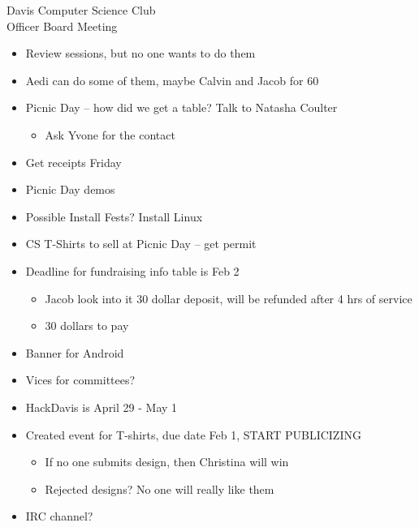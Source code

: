 \documentclass{article}
\begin{document}
\begin{Minutes}{Davis Computer Science Club\\Officer Board Meeting}
\begin{itemize}
    \item Review sessions, but no one wants to do them
    \item Aedi can do some of them, maybe Calvin and Jacob for 60
\end {itemize}

\begin {itemize}
    \item Picnic Day -- how did we get a table? Talk to Natasha Coulter 
        \begin{itemize}
            \item Ask Yvone for the contact
        \end{itemize}
    \item Get receipts Friday
    \item Picnic Day demos 
\end {itemize}

\begin {itemize}
    \item Possible Install Fests? Install Linux
    \item CS T-Shirts to sell at Picnic Day -- get permit
    \item Deadline for fundraising info table is Feb 2 
        \begin{itemize}
            \item Jacob look into it 30 dollar deposit, will be refunded after 4 hrs of service
            \item 30 dollars to pay
        \end{itemize}
    \item Banner for Android
    \item Vices for committees?
    \item HackDavis is April 29 - May 1
    \item Created event for T-shirts, due date Feb 1, START PUBLICIZING
        \begin{itemize}
            \item If no one submits design, then Christina will win 
            \item Rejected designs? No one will really like them
        \end{itemize}
    \item IRC channel?
\end {itemize}

\end{Minutes}
\thispagestyle{creditfooter}
\end{document}
